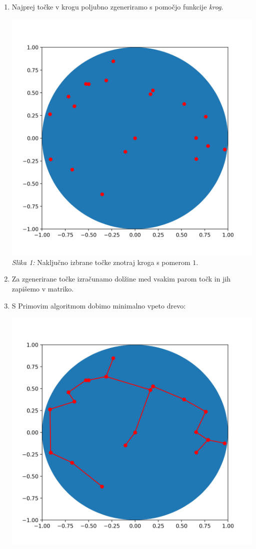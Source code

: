 \documentclass[a4paper]{report}
\begin{document}
\begin{enumerate}
\item Najprej točke v krogu poljubno zgeneriramo s pomočjo funkcije \textit{krog}.
\begin{center}
\includegraphics[scale = 0.4]{slikatockekrog}\\ 
\scriptsize{\textit{Slika 1: } Naključno izbrane točke znotraj kroga s pomerom $1$.}
\end{center}
\item Za zgenerirane točke izračunamo dolžine med vsakim parom točk in jih zapišemo v matriko. 
\item S Primovim algoritmom dobimo minimalno vpeto drevo:
\begin{center}
\includegraphics[scale = 0.4]{slikadrevokrog}\\ 

\end{center}
\end{enumerate}
\end{document}
